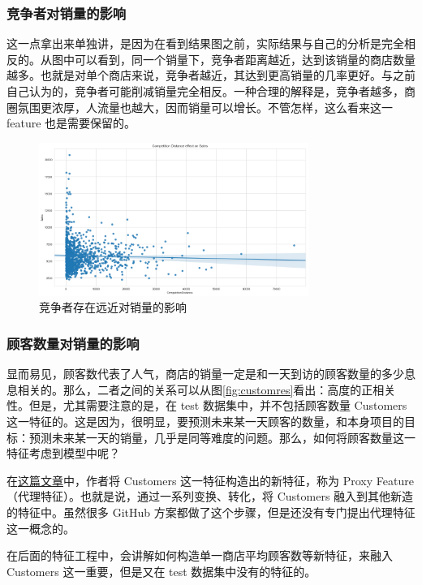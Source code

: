 \documentclass[a4paper]{article}
\begin{document}
\subsubsection{竞争者对销量的影响}
这一点拿出来单独讲，是因为在看到结果图之前，实际结果与自己的分析是完全相反的。从图中可以看到，同一个销量下，竞争者距离越近，达到该销量的商店数量越多。也就是对单个商店来说，竞争者越近，其达到更高销量的几率更好。与之前自己认为的，竞争者可能削减销量完全相反。一种合理的解释是，竞争者越多，商圈氛围更浓厚，人流量也越大，因而销量可以增长。不管怎样，这么看来这一 feature 也是需要保留的。
\begin{figure}[ht]
 \centering
 \includegraphics[height=5cm]{images/comp-distance.png}
 \caption{竞争者存在远近对销量的影响}
 \label{fig:distance}
\end{figure}


\subsubsection{顾客数量对销量的影响}
显而易见，顾客数代表了人气，商店的销量一定是和一天到访的顾客数量的多少息息相关的。那么，二者之间的关系可以从图\ref{fig:customres}看出：高度的正相关性。但是，尤其需要注意的是，在 test 数据集中，并不包括顾客数量 Customers 这一特征的。这是因为，很明显，要预测未来某一天顾客的数量，和本身项目的目标：预测未来某一天的销量，几乎是同等难度的问题。那么，如何将顾客数量这一特征考虑到模型中呢？

在\href{https://solgirouard.github.io/Rossmann_CS109A/notebooks/feature_engineering.html}{这篇文章}中，作者将 Customers 这一特征构造出的新特征，称为 Proxy Feature （代理特征）。也就是说，通过一系列变换、转化，将 Customers 融入到其他新造的特征中。虽然很多 GitHub 方案都做了这个步骤，但是还没有专门提出代理特征这一概念的。

在后面的特征工程中，会讲解如何构造单一商店平均顾客数等新特征，来融入 Customers 这一重要，但是又在 test 数据集中没有的特征的。
\end{document}

